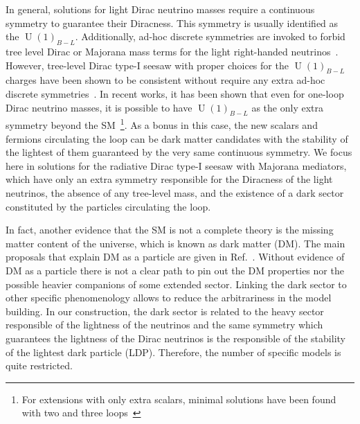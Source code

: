 \documentclass[12pt]{article}
\begin{document}
In general, solutions for light Dirac neutrino masses require a
continuous symmetry to guarantee their Diracness. This symmetry is
usually identified as the $\operatorname{U}(1)_{B-L}$.  Additionally,
ad-hoc discrete symmetries are invoked to forbid tree level Dirac or
Majorana mass terms for the light right-handed
neutrinos~\cite{Roncadelli:1983ty,Han:2018zcn,Wang:2017mcy}. 
However, tree-level Dirac type-I seesaw with proper choices for the
$\operatorname{U}(1)_{B-L}$ charges have been shown to be consistent
without require any extra ad-hoc discrete symmetries~\cite{Ma:2014qra}.
In recent works, it has been shown that even for one-loop Dirac
neutrino masses, it is possible to have $\operatorname{U}(1)_{B-L}$ as
the only extra symmetry beyond the SM~\cite{Calle:2018ovc,Bonilla:2018ynb,Saad:2019bqf}\footnote{
  For extensions with only extra scalars, minimal solutions have been found with two and three loops~\cite{Saad:2019bqf}}.
As a bonus in this case, the new scalars and fermions circulating the
loop can be dark matter candidates with the stability of the lightest
of them guaranteed by the very same continuous symmetry.
We focus here in solutions for the radiative Dirac type-I seesaw with
Majorana mediators, which have only an extra symmetry responsible for the
Diracness of the light neutrinos, the absence of any tree-level
mass, and the existence of a dark sector constituted by the
particles circulating the loop.

In fact, another evidence that the SM is not a complete theory is the
missing matter content of the universe, which is known as dark matter
(DM).
The main proposals that explain DM as a particle are given in
Ref.~\cite{Bertone:2004pz}.
Without evidence of DM as a particle there is not a clear path to pin
out the DM properties nor the possible heavier companions of some
extended sector. 
Linking the dark sector to other specific phenomenology allows to
reduce the arbitrariness in the model building.
In our construction, the dark sector is related to the heavy sector
responsible of the lightness of the neutrinos and the same symmetry
which guarantees the lightness of the Dirac neutrinos is the
responsible of the stability of the lightest dark particle (LDP).
Therefore, the number of specific models is quite restricted.
\end{document}
